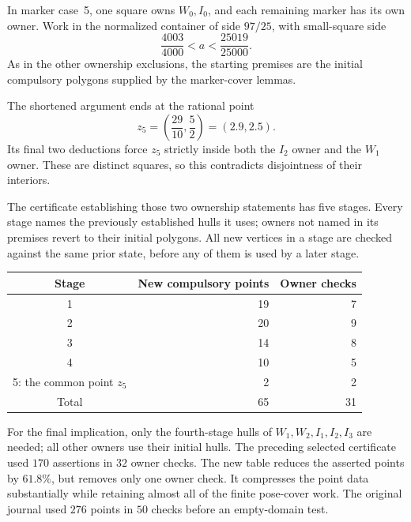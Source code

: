 \documentclass[11pt]{article}
\begin{document}
In marker case~5, one square owns $W_0,I_0$, and each remaining marker
has its own owner.  Work in the normalized container of side $97/25$, with
small-square side
\[
 \frac{4003}{4000}<a<\frac{25019}{25000}.
\]
As in the other ownership exclusions, the starting premises are the
initial compulsory polygons supplied by the marker-cover lemmas.

The shortened argument ends at the rational point
\[
 z_5=\left(\frac{29}{10},\frac52\right)=(2.9,2.5).
\]
Its final two deductions force $z_5$ strictly inside both the $I_2$ owner
and the $W_1$ owner.  These are distinct squares, so this contradicts
disjointness of their interiors.

The certificate establishing those two ownership statements has five
stages.  Every stage names the previously established hulls it uses;
owners not named in its premises revert to their initial polygons.
All new vertices in a stage are checked against the same prior state,
before any of them is used by a later stage.
\begin{center}
\begin{tabular}{c r r}
Stage & New compulsory points & Owner checks\\
\hline
1 & 19 & 7\\
2 & 20 & 9\\
3 & 14 & 8\\
4 & 10 & 5\\
5: the common point $z_5$ & 2 & 2\\
\hline
Total & 65 & 31
\end{tabular}
\end{center}
For the final implication, only the fourth-stage hulls of
$W_1,W_2,I_1,I_2,I_3$ are needed; all other owners use their initial hulls.
The preceding selected certificate used $170$ assertions in $32$ owner
checks. The new table reduces the asserted points by $61.8\%$, but removes
only one owner check. It compresses the point data substantially while
retaining almost all of the finite pose-cover work. The original journal
used $276$ points in $50$ checks before an empty-domain test.
\end{document}
